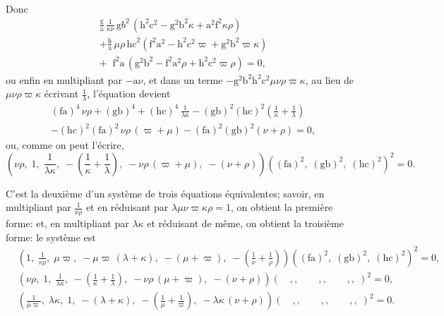 \documentclass[11pt,a4paper]{book}
\begin{document}
Donc
\begin{multline*}
\frac{\mathrm{g}}{\mathrm{a}}\,\frac{1}{\kappa\nu}\,
  \mathrm{g}b^2\,(\mathrm{h}^2\mathrm{c}^2-\mathrm{g}^2\mathrm{b}^2\kappa+\mathrm{a}^2\mathrm{f}^2\kappa\rho)\\
+\frac{\mathrm{h}}{\mathrm{a}}\,\mu\rho\,
  \mathrm{hc}^2(\mathrm{f}^2\mathrm{a}^2-\mathrm{h}^2\mathrm{c}^2\varpi+\mathrm{g}^2\mathrm{b}^2\varpi\kappa)\\
+\phantom{..}\mathrm{f}^2\mathrm{a}\,(\mathrm{g}^2\mathrm{b}^2-\mathrm{f}^2\mathrm{a}^2\rho+\mathrm{h}^2\mathrm{c}^2\varpi\rho)=0,
\end{multline*}
ou enfin en multipliant par $-\mathrm{a}\nu$, et dans un terme $-\mathrm{g}^2\mathrm{b}^2\mathrm{h}^2\mathrm{c}^2\mu\nu\rho\varpi\kappa$, au lieu de $\mu\nu\rho\varpi\kappa$ \'ecrivant $\frac{1}{\lambda}$, l'\'equation devient
\begin{multline*}
(\mathrm{fa})^4\,\nu\rho+(\mathrm{gb})^4+(\mathrm{hc})^4\,\frac{1}{\lambda\kappa}
-(\mathrm{gb})^2(\mathrm{hc})^2\left(\frac{1}{\kappa}+\frac{1}{\lambda}\right)\\
-(\mathrm{hc})^2(\mathrm{fa})^2\,\nu\rho\,(\varpi+\mu)
-(\mathrm{fa})^2(\mathrm{gb})^2(\nu+\rho)=0,
\end{multline*}
ou, comme on peut l'\'ecrire,
\[
\left(\nu\rho,\; 1,\; \frac{1}{\lambda\kappa},\; -\left(\frac{1}{\kappa}+\frac{1}{\lambda}\right),\;
-\nu\rho\,(\varpi+\mu),\; -(\nu+\rho)\right)
((\mathrm{fa})^2,\; (\mathrm{gb})^2,\; (\mathrm{hc})^2)^2=0.
\]

C'est la deuxi\`eme d'un syst\`eme de trois \'equations \'equivalentes; savoir, en multipliant par $\frac{1}{\nu\rho}$ et en r\'eduisant par $\lambda\mu\nu\varpi\kappa\rho=1$, on obtient la premi\`ere forme: et, en multipliant par $\lambda\kappa$ et r\'eduisant de m\^eme, on obtient la troisi\`eme forme: le syst\`eme est
\begin{align*}
&\left(1,\; \frac{1}{\nu\rho},\; \mu\varpi,\; -\mu\varpi\,(\lambda+\kappa),\;
-(\mu+\varpi),\; -\left(\frac{1}{\nu}+\frac{1}{\rho}\right)\right)
((\mathrm{fa})^2,\; (\mathrm{gb})^2,\; (\mathrm{hc})^2)^2=0,\\
&\left(\nu\rho,\; 1,\; \frac{1}{\lambda\kappa},\; -\left(\frac{1}{\kappa}+\frac{1}{\lambda}\right),\;
-\nu\rho\,(\mu+\varpi),\; -(\nu+\rho)\right)(\quad,,\qquad,,\qquad,,\;)^2=0,\\
&\left(\frac{1}{\mu\varpi},\; \lambda\kappa,\; 1,\; -(\lambda+\kappa),\;
-\left(\frac{1}{\mu}+\frac{1}{\varpi}\right),\; -\lambda\kappa\,(\nu+\rho)\right)(\quad,,\qquad,,\qquad,,\;)^2=0.
\end{align*}
\end{document}
